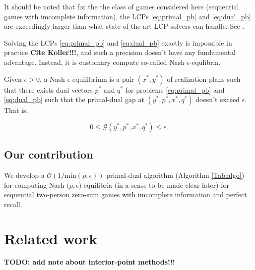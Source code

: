 \documentclass[envcountsame]{llcns2e/llncs}
\begin{document}

\begin{remark}  
It should be noted that for the the class of games considered here (sequential games with imcomplete information), the LCPs \eqref{eq:primal_pb} and \eqref{eq:dual_pb} are exceedingly larger than what state-of-the-art LCP solvers can handle. See \cite{hoda2010smoothing}.
\end{remark}

Solving the LCPs \eqref{eq:primal_pb} and \eqref{eq:dual_pb} exactly is impossible in practice \textbf{Cite Koller!!!}, and such a precision doesn't have any fundamental advantage. Instead, it is customary compute so-called Nash $\epsilon$-equlibria.

\begin{definition}
Given $\epsilon > 0$, a Nash $\epsilon$-equilibrium is
a pair $(x^*, y^*)$ of realization plans such that there exists dual
vectors $p^*$ and $q^*$ for problems \eqref{eq:primal_pb} and
\eqref{eq:dual_pb} such that the primal-dual gap at $(y^*, p^*, x^*, q^*)$
doesn't exceed $\epsilon$. That is,

\begin{equation}
  0 \le \mathcal{G}(y^*, p^*, x^*, q^*) \le \epsilon.
\label{eq:approx_pb}
\end{equation}
\label{thm:approx_nash}
\end{definition}

\subsection{Our contribution}
We develop a $\mathcal{O}(1/\text{min}(\rho,\epsilon))$ primal-dual
algorithm (Algorithm \ref{Tab:algo}) for computing Nash $(\rho,
  \epsilon$)-equilibria (in a sense to be made clear later) for
  sequential two-person zero-sum games with imcomplete information and
  perfect recall.

\section{Related work}
\label{sec:related_work}
\textbf{TODO: add note about interior-point methods!!!}
\end{document}
